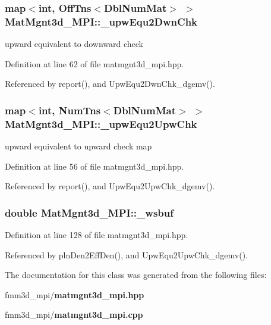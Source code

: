 \subsubsection{\setlength{\rightskip}{0pt plus 5cm}map$<$int, Off\-Tns$<$Dbl\-Num\-Mat$>$ $>$ {\bf Mat\-Mgnt3d\_\-MPI::\_\-upw\-Equ2Dwn\-Chk}}\label{classMatMgnt3d__MPI_4433042b9af17fab86b8f035b255d886_4433042b9af17fab86b8f035b255d886}


upward equivalent to downward check 

Definition at line 62 of file matmgnt3d\_\-mpi.hpp.

Referenced by report(), and Upw\-Equ2Dwn\-Chk\_\-dgemv().
\subsubsection{\setlength{\rightskip}{0pt plus 5cm}map$<$int, Num\-Tns$<$Dbl\-Num\-Mat$>$ $>$ {\bf Mat\-Mgnt3d\_\-MPI::\_\-upw\-Equ2Upw\-Chk}}\label{classMatMgnt3d__MPI_99d61bd38f82cf6e8a44bdfe501e2dda_99d61bd38f82cf6e8a44bdfe501e2dda}


upward equivalent to upward check map 

Definition at line 56 of file matmgnt3d\_\-mpi.hpp.

Referenced by report(), and Upw\-Equ2Upw\-Chk\_\-dgemv().
\subsubsection{\setlength{\rightskip}{0pt plus 5cm}double {\bf Mat\-Mgnt3d\_\-MPI::\_\-wsbuf}\hspace{0.3cm}{\tt  [static]}}\label{classMatMgnt3d__MPI_526f8f4a77395e52ecb0eb6d09440edc_526f8f4a77395e52ecb0eb6d09440edc}




Definition at line 128 of file matmgnt3d\_\-mpi.hpp.

Referenced by pln\-Den2Eff\-Den(), and Upw\-Equ2Upw\-Chk\_\-dgemv().

The documentation for this class was generated from the following files:\begin{CompactItemize}
\item 
fmm3d\_\-mpi/{\bf matmgnt3d\_\-mpi.hpp}\item 
fmm3d\_\-mpi/{\bf matmgnt3d\_\-mpi.cpp}\end{CompactItemize}
